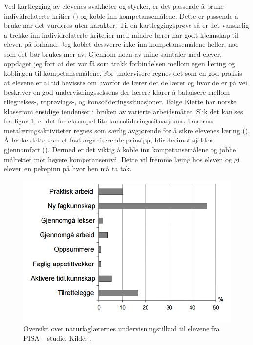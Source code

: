 \documentclass[main.tex]{subfiles}
\begin{document}
Ved kartlegging av elevenes svakheter og styrker, er det passende å bruke individrelaterte kritier 
() og koble inn kompetansemålene. Dette er passende å bruke når det vurderes uten karakter. 
Til en kartleggingsprøve så er det 
vanskelig å trekke inn individrelaterte kriterier med mindre lærer har godt kjennskap til eleven på forhånd. Jeg 
koblet dessverre ikke inn kompetansemålene heller, noe som det bør brukes mer av. Gjennom noen av mine samtaler 
med elever, oppdaget jeg fort at det var få som trakk forbindelsen mellom egen læring og koblingen til kompetansemålene. 
For undervisere regnes det som en god praksis at elevene er alltid bevisste om hvorfor de lærer det de lærer og hvor 
de er på vei.  beskriver en god undervisningsseksens der lærere klarer å balansere mellom 
tilegnelses-, utprøvings-, og konsolideringssituasjoner. Ifølge Klette har norske klasserom ensidige tendenser i bruken 
av varierte arbeidsmåter. Slik det kan ses fra figur \ref{fig:odeg10}, er det for eksempel lite 
konsolideringssituasjoner. Lærernes metalæringsaktiviteter regnes som særlig avgjørende for å sikre elevenes læring 
(). Å bruke dette som et fast organiserende prinsipp, blir derimot sjelden gjennomført 
(). Dermed er det viktig å koble inn kompetansemålene og jobbe målrettet mot høyere
kompetansenivå. Dette vil fremme læing hos eleven og gi eleven en pekepinn på hvor hen må ta tak. 
\begin{figure}[h!]
\includegraphics[scale = 0.6]{../figures/undervisnings_aktivitet.png}
\caption{Oversikt over naturfaglærernes undervisningstilbud til elevene fra PISA+ studie. Kilde: 
\protect{}.}
\label{fig:odeg10}
\end{figure}
\newline
\end{document}
